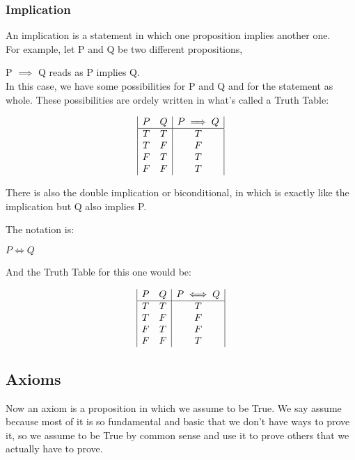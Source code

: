 \documentclass{article}
\begin{document}
\subsubsection{Implication}
An implication is a statement
in which one proposition implies another one.\\

For example, let P and Q be two different propositions,

P $\implies$ Q reads as P implies Q.\\

In this case, we have some possibilities for P and Q and for the
statement as whole.
These possibilities are ordely written in what's called a Truth Table:

\begin{displaymath}
    \begin{array}{|c c|c|}
        P & Q & P \implies Q\\
        \hline
        T & T & T\\
        T & F & F\\
        F & T & T\\
        F & F & T\\
    \end{array}
\end{displaymath}

\newpage
\indent
There is also the double implication
or biconditional, in which is exactly 
like the implication but Q also implies P.

The notation is:

$P \iff Q$

And the Truth Table for this one would be:

\begin{displaymath}
    \begin{array}{|c c|c|}
        P & Q & P \iff Q\\
        \hline
        T & T & T\\
        T & F & F\\
        F & T & F\\
        F & F & T\\
    \end{array}
\end{displaymath}

\subsection{Axioms}


Now an axiom is a proposition in which
we assume to be True. We say assume because most of it
is so fundamental and basic that we don't have
ways to prove it, so we assume to be True
by common sense and use it 
to prove others that we actually have to prove.\\
\end{document}
